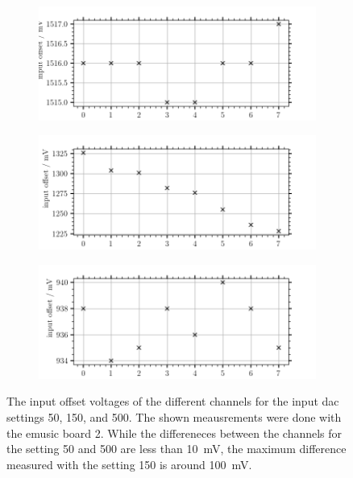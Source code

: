 \begin{figure}
	\centering
	\begin{subfigure}[b]{1.\textwidth}
		\centering
		\includegraphics[width=1.\textwidth]{pictures/input_offset_b2_dac50}
		\caption{}
		\label{fig:input_offset_b2_dac50}
	\end{subfigure}
	
	\begin{subfigure}[b]{1.\textwidth}
		\centering
		\includegraphics[width=1.\textwidth]{pictures/input_offset_b2_dac150}
		\caption{}
		\label{fig:input_offset_b2_dac150}
	\end{subfigure}

	\begin{subfigure}[b]{1.\textwidth}
		\centering
		\includegraphics[width=1.\textwidth]{pictures/input_offset_b2_dac500}
		\caption{}
		\label{fig:input_offset_b2_dac500}
	\end{subfigure}
	\caption[Input offset voltage of all channels for differen \ac{dac} settings]{The input offset voltages of the different channels for the input \ac{dac} settings 50, 150, and 500. The shown meausrements were done with the \ac{emusic} board 2. While the differeneces between the channels for the setting 50 and 500 are less than \SI{10}{\milli\volt}, the maximum difference measured with the setting 150 is around \SI{100}{\milli\volt}.}
	\label{fig:input_offset_b2_dac}
\end{figure}

